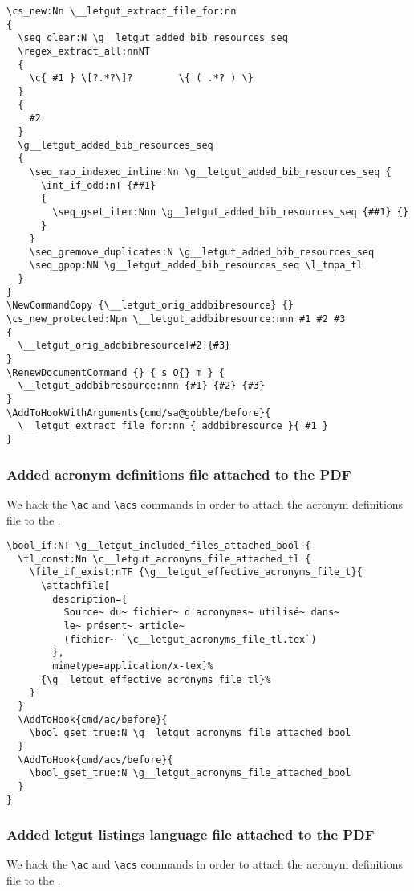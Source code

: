 \documentclass{letgut}
\begin{document}
\begin{lstlisting}
\cs_new:Nn \__letgut_extract_file_for:nn
{
  \seq_clear:N \g__letgut_added_bib_resources_seq
  \regex_extract_all:nnNT
  {
    \c{ #1 } \[?.*?\]?        \{ ( .*? ) \}
  }
  {
    #2
  }
  \g__letgut_added_bib_resources_seq
  {
    \seq_map_indexed_inline:Nn \g__letgut_added_bib_resources_seq {
      \int_if_odd:nT {##1}
      {
        \seq_gset_item:Nnn \g__letgut_added_bib_resources_seq {##1} {}
      }
    }
    \seq_gremove_duplicates:N \g__letgut_added_bib_resources_seq
    \seq_gpop:NN \g__letgut_added_bib_resources_seq \l_tmpa_tl
  }
}
\NewCommandCopy {\__letgut_orig_addbibresource} {}
\cs_new_protected:Npn \__letgut_addbibresource:nnn #1 #2 #3
{
  \__letgut_orig_addbibresource[#2]{#3}
}
\RenewDocumentCommand {} { s O{} m } {
  \__letgut_addbibresource:nnn {#1} {#2} {#3}
}
\AddToHookWithArguments{cmd/sa@gobble/before}{
  \__letgut_extract_file_for:nn { addbibresource }{ #1 }
}
\end{lstlisting}

\subsubsection{Added acronym definitions file attached to the PDF}
\label{ImplementationMiscellanousAddedbibliographicressourcesattachedtothePDF-l4e34ja00pj0}
We hack the \lstinline+\ac+ and \lstinline+\acs+ commands in order to attach the acronym definitions
file to the \pdf{}.

\begin{lstlisting}
\bool_if:NT \g__letgut_included_files_attached_bool {
  \tl_const:Nn \c__letgut_acronyms_file_attached_tl {
    \file_if_exist:nTF {\g__letgut_effective_acronyms_file_t}{
      \attachfile[
        description={
          Source~ du~ fichier~ d'acronymes~ utilisé~ dans~
          le~ présent~ article~
          (fichier~ `\c__letgut_acronyms_file_tl.tex`)
        },
        mimetype=application/x-tex]%
      {\g__letgut_effective_acronyms_file_tl}%
    }
  }
  \AddToHook{cmd/ac/before}{
    \bool_gset_true:N \g__letgut_acronyms_file_attached_bool
  }
  \AddToHook{cmd/acs/before}{
    \bool_gset_true:N \g__letgut_acronyms_file_attached_bool
  }
}
\end{lstlisting}

\subsubsection{Added letgut listings language file attached to the PDF}
\label{ImplementationMiscellanousAddedbibliographicressourcesattachedtothePDF-l4e34ja00pj0}
We hack the \lstinline+\ac+ and \lstinline+\acs+ commands in order to attach the acronym definitions
file to the \pdf{}.
\end{document}
